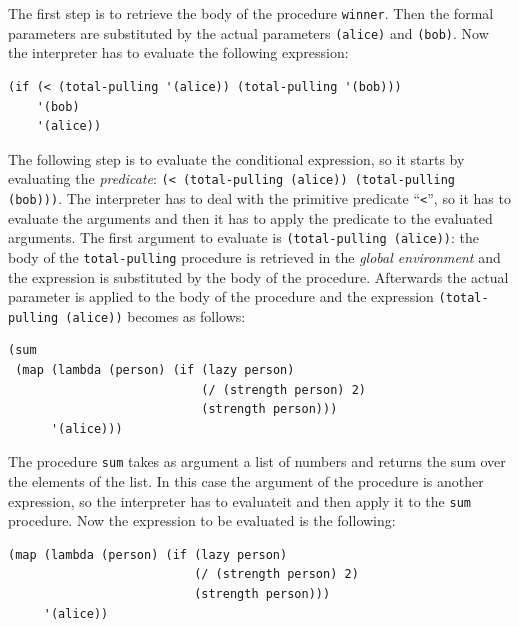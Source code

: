 \begin{itemize}
        The first step is to retrieve the body of the procedure \texttt{winner}. Then the formal parameters are substituted by 
        the actual parameters \texttt{\textquotesingle(alice)} and \texttt{\textquotesingle(bob)}. 
        Now the interpreter has to evaluate the following expression:
        \begin{lstlisting}[caption={Body of procedure \texttt{winner} with actual parameters}, captionpos=b]
(if (< (total-pulling '(alice)) (total-pulling '(bob)))
    '(bob)
    '(alice))
        \end{lstlisting}
        The following step is to evaluate the conditional expression, so it starts by evaluating the \textit{predicate}: 
        \texttt{(< (total-pulling \textquotesingle(alice)) (total-pulling \textquotesingle(bob)))}. 
        The interpreter has to deal with the primitive predicate ``\texttt{<}'', so it has to evaluate the arguments and then 
        it has to apply the predicate to the evaluated arguments.
        The first argument to evaluate is \texttt{(total-pulling \textquotesingle(alice))}: the body of the \texttt{total-pulling} procedure 
        is retrieved in the \textit{global environment} and the expression is substituted by the body of the procedure.
        Afterwards the actual parameter is applied to the body of the procedure and the expression 
        \texttt{(total-pulling \textquotesingle(alice))} becomes as follows:
        \begin{lstlisting}[caption={Body of procedure \texttt{total-pulling} with actual parameters \texttt{\textquotesingle(alice)}}, captionpos=b, label={lst:t-p}]
(sum
 (map (lambda (person) (if (lazy person)
                           (/ (strength person) 2)
                           (strength person)))
      '(alice)))
        \end{lstlisting}
        The procedure \texttt{sum} takes as argument a list of numbers and returns the sum over the elements of the list. In this case
        the argument of the procedure is another expression, so the interpreter has to evaluateit and then apply it to the \texttt{sum}
        procedure.
        Now the expression to be evaluated is the following:
        \begin{lstlisting}[caption={Argument of procedure \texttt{sum} in Listing~\ref{lst:t-p}}, captionpos=b, label={lst:map}]
(map (lambda (person) (if (lazy person)
                          (/ (strength person) 2)
                          (strength person)))
     '(alice))
        \end{lstlisting}

\end{itemize}
